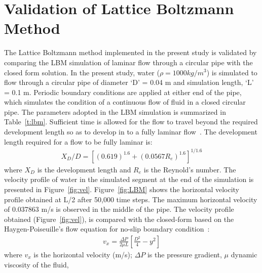 \section{Validation of Lattice Boltzmann Method}
The Lattice Boltzmann method implemented in the present study is validated by comparing the LBM simulation of laminar flow  through a circular pipe with the closed form solution. In the present study, water ($\rho=1000 kg/m^{3}$) is simulated to flow through a circular pipe of diameter `D' = 0.04 m and simulation length, `L' = 0.1 m. Periodic boundary conditions are applied at either end of the pipe, which simulates the condition of a continuous flow of fluid in a closed circular pipe. The parameters adopted in the LBM simulation is summarized in Table~\ref{t:lbm}. Sufficient time is allowed for the flow to travel beyond the required development length so as to develop in to a fully laminar flow~\citet{durst2005}. The development length required for a flow to be fully laminar is:
\begin{align}
X_{D}/D=[(0.619)^{1.6}+(0.0567 R_{e})^{1.6}]^{1/1.6}
\end{align}
where $X_{D}$ is the development length and $R_{e}$ is the Reynold's number. The velocity profile of water in the simulated segment at the end of the simulation is presented in Figure~\ref{fig:vel}. Figure~\ref{fig:LBM} shows the horizontal velocity profile obtained at L/2 after 50,000 time steps. The maximum horizontal velocity of 0.037863 m/s is observed in the middle of the pipe. The velocity profile obtained (Figure~\ref{fig:vel}), is compared with the closed-form based on the Haygen-Poiseuille's flow equation for no-slip boundary condition~\citep{willis2008}:
\begin{align}
\textit{v}_{\textit{x}}=\frac{\Delta P}{2 \mu L} [\frac{D^{2}}{4}-y^{2}]
\end{align}
where $v_{x}$ is the horizontal velocity (m/s); $\Delta P$ is the pressure gradient, $\mu$ dynamic viscosity of the fluid, 
